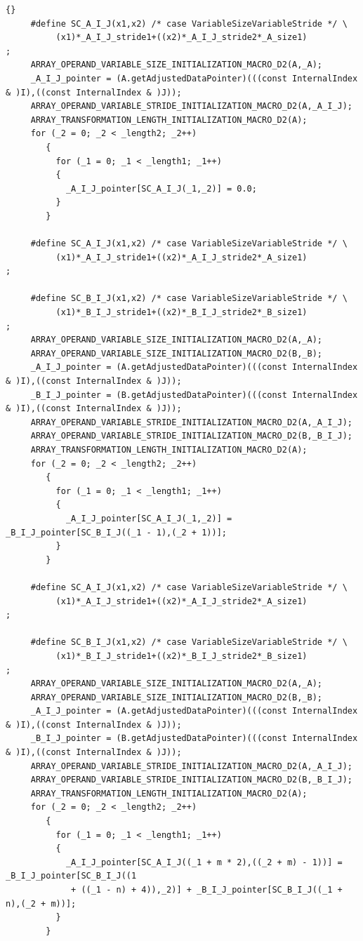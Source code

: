 \documentclass[10pt]{article}
\begin{document}
\begin{lstlisting}{}
     #define SC_A_I_J(x1,x2) /* case VariableSizeVariableStride */ \
          (x1)*_A_I_J_stride1+((x2)*_A_I_J_stride2*_A_size1)
; 
     ARRAY_OPERAND_VARIABLE_SIZE_INITIALIZATION_MACRO_D2(A,_A); 
     _A_I_J_pointer = (A.getAdjustedDataPointer)(((const InternalIndex & )I),((const InternalIndex & )J)); 
     ARRAY_OPERAND_VARIABLE_STRIDE_INITIALIZATION_MACRO_D2(A,_A_I_J); 
     ARRAY_TRANSFORMATION_LENGTH_INITIALIZATION_MACRO_D2(A); 
     for (_2 = 0; _2 < _length2; _2++)
        { 
          for (_1 = 0; _1 < _length1; _1++)
          { 
            _A_I_J_pointer[SC_A_I_J(_1,_2)] = 0.0; 
          } 
        } 
        
     #define SC_A_I_J(x1,x2) /* case VariableSizeVariableStride */ \
          (x1)*_A_I_J_stride1+((x2)*_A_I_J_stride2*_A_size1)
; 
        
     #define SC_B_I_J(x1,x2) /* case VariableSizeVariableStride */ \
          (x1)*_B_I_J_stride1+((x2)*_B_I_J_stride2*_B_size1)
; 
     ARRAY_OPERAND_VARIABLE_SIZE_INITIALIZATION_MACRO_D2(A,_A); 
     ARRAY_OPERAND_VARIABLE_SIZE_INITIALIZATION_MACRO_D2(B,_B); 
     _A_I_J_pointer = (A.getAdjustedDataPointer)(((const InternalIndex & )I),((const InternalIndex & )J)); 
     _B_I_J_pointer = (B.getAdjustedDataPointer)(((const InternalIndex & )I),((const InternalIndex & )J)); 
     ARRAY_OPERAND_VARIABLE_STRIDE_INITIALIZATION_MACRO_D2(A,_A_I_J); 
     ARRAY_OPERAND_VARIABLE_STRIDE_INITIALIZATION_MACRO_D2(B,_B_I_J); 
     ARRAY_TRANSFORMATION_LENGTH_INITIALIZATION_MACRO_D2(A); 
     for (_2 = 0; _2 < _length2; _2++)
        { 
          for (_1 = 0; _1 < _length1; _1++)
          { 
            _A_I_J_pointer[SC_A_I_J(_1,_2)] = _B_I_J_pointer[SC_B_I_J((_1 - 1),(_2 + 1))]; 
          } 
        } 
        
     #define SC_A_I_J(x1,x2) /* case VariableSizeVariableStride */ \
          (x1)*_A_I_J_stride1+((x2)*_A_I_J_stride2*_A_size1)
; 
        
     #define SC_B_I_J(x1,x2) /* case VariableSizeVariableStride */ \
          (x1)*_B_I_J_stride1+((x2)*_B_I_J_stride2*_B_size1)
; 
     ARRAY_OPERAND_VARIABLE_SIZE_INITIALIZATION_MACRO_D2(A,_A); 
     ARRAY_OPERAND_VARIABLE_SIZE_INITIALIZATION_MACRO_D2(B,_B); 
     _A_I_J_pointer = (A.getAdjustedDataPointer)(((const InternalIndex & )I),((const InternalIndex & )J)); 
     _B_I_J_pointer = (B.getAdjustedDataPointer)(((const InternalIndex & )I),((const InternalIndex & )J)); 
     ARRAY_OPERAND_VARIABLE_STRIDE_INITIALIZATION_MACRO_D2(A,_A_I_J); 
     ARRAY_OPERAND_VARIABLE_STRIDE_INITIALIZATION_MACRO_D2(B,_B_I_J); 
     ARRAY_TRANSFORMATION_LENGTH_INITIALIZATION_MACRO_D2(A); 
     for (_2 = 0; _2 < _length2; _2++)
        { 
          for (_1 = 0; _1 < _length1; _1++)
          { 
            _A_I_J_pointer[SC_A_I_J((_1 + m * 2),((_2 + m) - 1))] = _B_I_J_pointer[SC_B_I_J((1
             + ((_1 - n) + 4)),_2)] + _B_I_J_pointer[SC_B_I_J((_1 + n),(_2 + m))]; 
          } 
        } 
        

\end{lstlisting}
\end{document}
